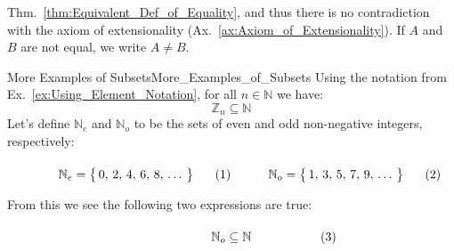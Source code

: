         Thm.~\ref{thm:Equivalent_Def_of_Equality}, and thus there is no
        contradiction with the axiom of extensionality
        (Ax.~\ref{ax:Axiom_of_Extensionality}). If $A$ and $B$ are not equal, we
        write $A\ne{B}$. 
        \begin{lexample}{More Examples of Subsets}{More_Examples_of_Subsets}
            Using the notation from Ex.~\ref{ex:Using_Element_Notation}, for all
            $n\in\mathbb{N}$ we have:
            \begin{equation}
                \mathbb{Z}_{n}\subseteq\mathbb{N}
            \end{equation}
            Let's define $\mathbb{N}_{e}$ and $\mathbb{N}_{o}$ to be the sets of
            even and odd non-negative
            integers, respectively:
            \par
            \begin{subequations}
                \begin{minipage}[b]{0.49\textwidth}
                    \begin{equation}
                        \label{eqn:Even_Pos_Ints_Ellipses}%
                        \mathbb{N}_{e}=\big\{\,0,\,2,\,4,\,6,\,8,\,\dots\,\big\}
                    \end{equation}
                \end{minipage}
                \hfill
                \begin{minipage}[b]{0.49\textwidth}
                    \begin{equation}
                        \label{eqn:Odd_Pos_Ints_Ellipses}%
                        \mathbb{N}_{o}=\big\{\,1,\,3,\,5,\,7,\,9,\,\dots\,\big\}
                    \end{equation}
                \end{minipage}
            \end{subequations}
            \par\vspace{2.5ex}
            From this we see the following two expressions are true:
            \par\hfill\par
            \begin{subequations}
                \begin{minipage}[b]{0.49\textwidth}
                    \begin{equation}
                        \mathbb{N}_{o}\subseteq\mathbb{N}
                    \end{equation}

\end{minipage}
\end{subequations}
\end{lexample}
